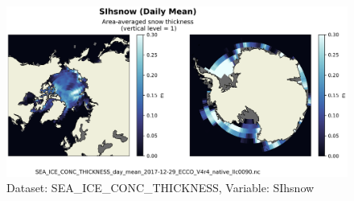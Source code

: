 \begin{figure}[H]
\centering
\includegraphics[scale=0.55]{../images/plots/v4r4/native_plots/Sea-Ice_and_Snow_Concentration_and_Thickness/SIhsnow.png}
\caption{Dataset: SEA\_ICE\_CONC\_THICKNESS, Variable: SIhsnow}
\label{tab:table-SEA_ICE_CONC_THICKNESS_SIhsnow-Plot}
\end{figure}
\newpage
\pagebreak
